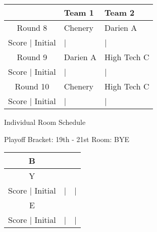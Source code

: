 \documentclass{article}%
\begin{document}
%
\begin{tabularx}{\textwidth}{|c|Y|Y|}%
\hline%
&Team 1&Team 2\\%
\hline%
Round 8&Chenery&Darien A\\%
\hline%
Score | Initial&|&|\\%
\hline%
Round 9&Darien A&High Tech C\\%
\hline%
Score | Initial&|&|\\%
\hline%
Round 10&Chenery&High Tech C\\%
\hline%
Score | Initial&|&|\\%
\hline%
\end{tabularx}%
\vspace*{16pt}%
\linebreak%
\newpage%
\begin{center}%
\begin{Huge}%
Individual Room Schedule%
\end{Huge}%
\vspace*{16pt}%
\linebreak%
\begin{Large}%
Playoff Bracket: 19th - 21st \hfill Room: BYE%
\end{Large}%
\end{center}%
%
\begin{tabularx}{\textwidth}{|c|Y|Y|}%
\hline%
B\\%
\hline%
Y\\%
\hline%
Score | Initial&|&|\\%
\hline%
E\\%
\hline%
Score | Initial&|&|\\%
\hline%
\end{tabularx}%
\vspace*{16pt}%
\linebreak%
\newpage%
\end{document}
